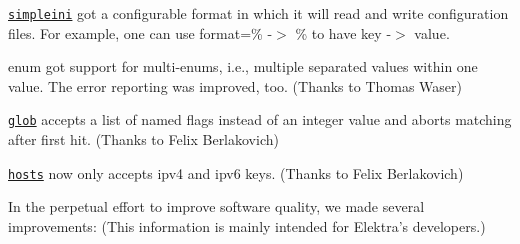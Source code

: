 \begin{DoxyItemize}
\item \href{https://master.libelektra.org/src/plugins/simpleini}{\tt simpleini} got a configurable format in which it will read and write configuration files. For example, one can use {\ttfamily format=\% -\/$>$ \%} to have {\ttfamily key -\/$>$ value}.
\item enum got support for multi-\/enums, i.\+e., multiple separated values within one value. The error reporting was improved, too. (Thanks to Thomas Waser)
\item \href{https://master.libelektra.org/src/plugins/glob}{\tt glob} accepts a list of named flags instead of an integer value and aborts matching after first hit. (Thanks to Felix Berlakovich)
\item \href{https://master.libelektra.org/src/plugins/hosts}{\tt hosts} now only accepts {\ttfamily ipv4} and {\ttfamily ipv6} keys. (Thanks to Felix Berlakovich)
\end{DoxyItemize}

In the perpetual effort to improve software quality, we made several improvements\+: (This information is mainly intended for Elektra’s developers.)



